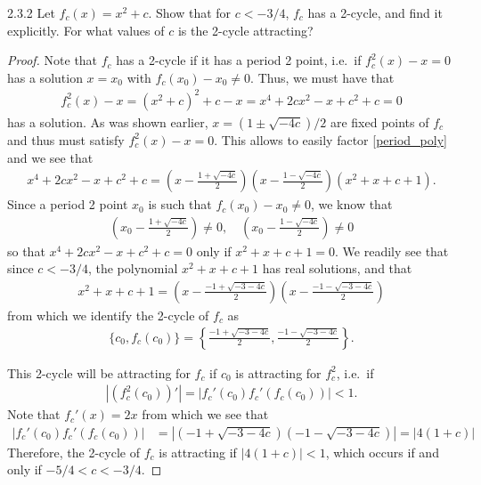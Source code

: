 \begin{problem}{2.3.2}
  Let $f_c(x) = x^2 + c$. Show that for $c < -3/4$, $f_c$ has a 2-cycle, and
  find it explicitly. For what values of $c$ is the 2-cycle attracting?
\end{problem}

\begin{proof}
  Note that $f_c$ has a 2-cycle if it has a period 2 point, i.e.\ if $f_c^2(x) - x = 0$
  has a solution $x = x_0$ with $f_c(x_0) - x_0 \neq 0$. Thus, we must have that
  \begin{align}\label{period_poly}
    f_c^2(x) - x = (x^2+c)^2 + c - x = x^4 + 2cx^2 - x + c^2 + c = 0
  \end{align}
  has a solution. As was shown earlier, $x = \left(1 \pm \sqrt{-4c}\right) / 2$
  are fixed points of $f_c$ and thus must satisfy $f_c^2(x) - x = 0$. This allows to easily
  factor \eqref{period_poly} and we see that
  \begin{align*}
    x^4 + 2cx^2 - x + c^2 + c= \left(x - \frac{1 + \sqrt{-4c}}{2} \right)\left(x - \frac{1 - \sqrt{-4c}}{2} \right)(x^2+x+c+1).
  \end{align*}
  Since a period 2 point $x_0$ is such that $f_c(x_0) - x_0 \neq 0$, we know that
  \begin{align*}
    \left(x_0 - \frac{1 + \sqrt{-4c}}{2} \right) \neq 0,\quad
    \left(x_0 - \frac{1 - \sqrt{-4c}}{2} \right) \neq 0
  \end{align*}
  so that $x^4 + 2cx^2 - x + c^2 + c = 0$ only if $x^2+x+c+1 = 0$.
  We readily see that since $c < -3/4$, the polynomial
  $x^2+x+c+1$ has real solutions, and that
  \begin{align*}
    x^2+x+c+1 = \left(x - \frac{-1+\sqrt{-3-4c}}{2}\right)\left(x - \frac{-1-\sqrt{-3-4c}}{2}\right)
  \end{align*}
  from which we identify the 2-cycle of $f_c$ as
  \begin{align*}
    \{c_0, f_c(c_0)\} = \left\{\frac{-1+\sqrt{-3-4c}}{2}, \frac{-1-\sqrt{-3-4c}}{2}\right\}.
  \end{align*}

  This 2-cycle will be attracting for $f_c$ if $c_0$ is attracting for $f^2_c$, i.e.\ if
  \begin{align*}
    \left|\left(f_c^2(c_0)\right)'\right| = \left|f_c'(c_0)f_c'(f_c(c_0))\right| < 1.
  \end{align*}
  Note that $f_c'(x) = 2x$ from which we see that
  \begin{align*}
    \left|f_c'(c_0)f_c'(f_c(c_0))\right| &= \left|\left(-1+\sqrt{-3-4c}\right)\left(-1-\sqrt{-3-4c}\right)\right| = \left|4(1 + c)\right|
  \end{align*}
  Therefore, the 2-cycle of $f_c$ is attracting if $\left|4(1 + c)\right| < 1$, which occurs if and only if $-5/4 < c < -3/4$.

\end{proof}
\newpage
